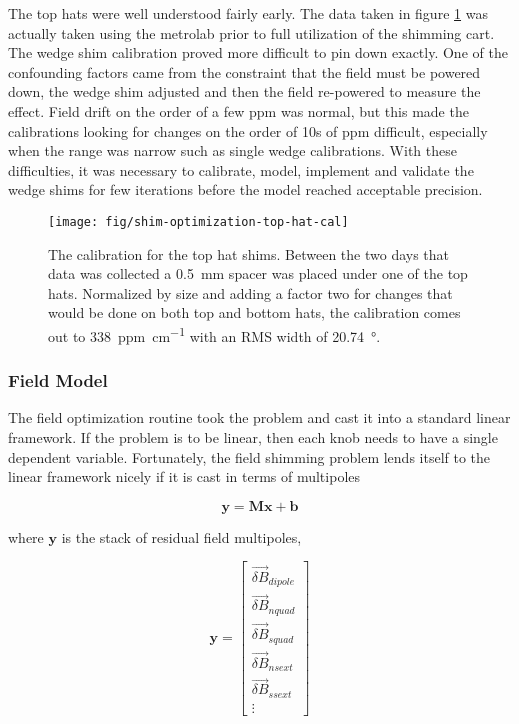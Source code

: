 The top hats were well understood fairly early.  The data taken in figure \ref{fig:shim-optimization-top-hat-cal} was actually taken using the metrolab prior to full utilization of the shimming cart.  The wedge shim calibration proved more difficult to pin down exactly.  One of the confounding factors came from the constraint that the field must be powered down, the wedge shim adjusted and then the field re-powered to measure the effect.  Field drift on the order of a few ppm was normal, but this made the calibrations looking for changes on the order of 10s of ppm difficult, especially when the range was narrow such as single wedge calibrations.  With these difficulties, it was necessary to calibrate, model, implement and validate the wedge shims for few iterations before the model reached acceptable precision.

\begin{figure}
\centering
\texttt{[image: fig/shim-optimization-top-hat-cal]}
\caption{
    The calibration for the top hat shims.  Between the two days that data was collected a \SI{0.5}{\milli\meter} spacer was placed under one of the top hats.  Normalized by size and adding a factor two for changes that would be done on both top and bottom hats, the calibration comes out to \SI{338}{ppm\per\centi\meter} with an RMS width of \SI{20.74}{\degree}. 
    \label{fig:shim-optimization-top-hat-cal}
}
\end{figure}


\subsubsection{Field Model}

The field optimization routine took the problem and cast it into a standard linear framework.  If the problem is to be linear, then each knob needs to have a single dependent variable.  Fortunately, the field shimming problem lends itself to the linear framework nicely if it is cast in terms of multipoles

\[
\mathbf{y} = \mathbf{M} \mathbf{x} + \mathbf{b}
\]

\noindent
where $\mathbf{y}$ is the stack of residual field multipoles, 

\[
\mathbf{y} = \begin{bmatrix}
\vec{\delta B}_{dipole} \\
\vec{\delta B}_{nquad} \\
\vec{\delta B}_{squad} \\
\vec{\delta B}_{nsext} \\ 
\vec{\delta B}_{ssext} \\
\vdots
\end{bmatrix}
\]

